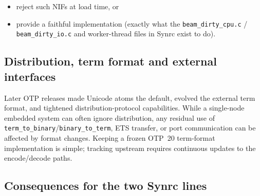 \documentclass{article}
\begin{document}
\begin{itemize}
  \item reject such NIFs at load time, or
  \item provide a faithful implementation (exactly what the \texttt{beam\_dirty\_cpu.c} / \texttt{beam\_dirty\_io.c} and worker-thread files in Synrc exist to do).
\end{itemize}

\subsection{Distribution, term format and external interfaces}

Later OTP releases made Unicode atoms the default, evolved the external term format, and tightened distribution-protocol capabilities.
While a single-node embedded system can often ignore distribution, any residual use of \texttt{term\_to\_binary}/\texttt{binary\_to\_term}, ETS transfer, or port communication can be affected by format changes.
Keeping a frozen OTP~20 term-format implementation is simple; tracking upstream requires continuous updates to the encode/decode paths.

\subsection{Consequences for the two Synrc lines}

\begin{center}
\noindent{}
\end{center}
\end{document}
